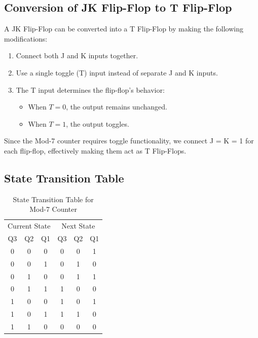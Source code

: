 \documentclass[a4paper,12pt]{article}
\begin{document}
\subsection{Conversion of JK Flip-Flop to T Flip-Flop}
A JK Flip-Flop can be converted into a T Flip-Flop by making the following modifications:
\begin{enumerate}
    \item Connect both J and K inputs together.
    \item Use a single toggle (T) input instead of separate J and K inputs.
    \item The T input determines the flip-flop's behavior:
          \begin{itemize}
              \item When \( T = 0 \), the output remains unchanged.
              \item When \( T = 1 \), the output toggles.
          \end{itemize}
\end{enumerate}
Since the Mod-7 counter requires toggle functionality, we connect J = K = 1 for each flip-flop, effectively making them act as T Flip-Flops.

\subsection{State Transition Table}
\begin{table}[H]
    \centering
    \begin{tabular}{c c c | c c c}
        \toprule
        \multicolumn{3}{c|}{Current State} & \multicolumn{3}{c}{Next State} \\
        Q3 & Q2 & Q1 & Q3 & Q2 & Q1 \\
        \midrule
        0 & 0 & 0 & 0 & 0 & 1 \\
        0 & 0 & 1 & 0 & 1 & 0 \\
        0 & 1 & 0 & 0 & 1 & 1 \\
        0 & 1 & 1 & 1 & 0 & 0 \\
        1 & 0 & 0 & 1 & 0 & 1 \\
        1 & 0 & 1 & 1 & 1 & 0 \\
        1 & 1 & 0 & 0 & 0 & 0 \\
        \bottomrule
    \end{tabular}
    \caption{State Transition Table for Mod-7 Counter}
\end{table}
\newpage
\end{document}
